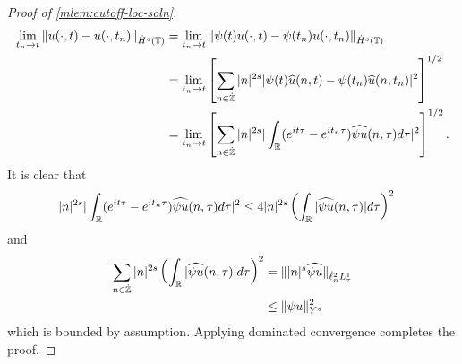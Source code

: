 \begin{proof}[Proof of \cref{mlem:cutoff-loc-soln}]
%
%
\begin{equation*}
	\begin{split}
		\lim_{t_{n} \to t} \|u(\cdot, t) - u(\cdot, t_{n})\|_{\dot{H}^s(\mathbb{T})} 
		& = \lim_{t_{n} \to t} \|\psi(t) u(\cdot, t) - \psi(t_n) u(\cdot,
		t_{n})\|_{\dot{H}^s(\mathbb{T})} 
		\\
		& = \lim_{t_n \to t} \left[ \sum_{n \in \dot{\mathbb{Z}}}| n |
		^{2s} | \psi(t)  \widehat{u}(n, t) - \psi(t_n) \widehat{ u}(n, t_n) |^2 \right]^{1/2}
		\\
		& = \lim_{t_n \to t} \left[ \sum_{n \in \dot{\mathbb{Z}}} | n |^{2s} | \int_{\mathbb{R}} (e^{it \tau} - e^{it_{n} \tau}) \widehat{\psi u}(n,
		\tau) d \tau |^2 \right]^{1/2}.
	\end{split}
\end{equation*}
		It is clear that
		\begin{equation*}
			\begin{split}
				| n |
				^{2s} | \int_{\mathbb{R}} (e^{it \tau} - e^{it_{n}\tau}) \widehat{\psi u}(n, \tau) d \tau |^2 
		& \le 4  | n |^{2s} \left ( \int_{\mathbb{R}} |\widehat{\psi u}(n, \tau)| d \tau
		\right )^2 
	\end{split}
\end{equation*}
and 
%
%
\begin{equation*}
	\begin{split}
 \sum_{n \in \dot{\mathbb{Z}}} | n |^{2s} \left ( \int_{\mathbb{R}} |\widehat{\psi u}(n, \tau)| d \tau
		\right ) ^2 
		& = \| |n |^s \widehat{\psi u}\|_{\dot{\ell}_n^2 L_\tau^1}
		\\
		& \le \|\psi u \|_{Y^s}^2 
	\end{split}
\end{equation*}
which is bounded by assumption.
Applying dominated convergence completes the proof. 
\end{proof}
%
%
